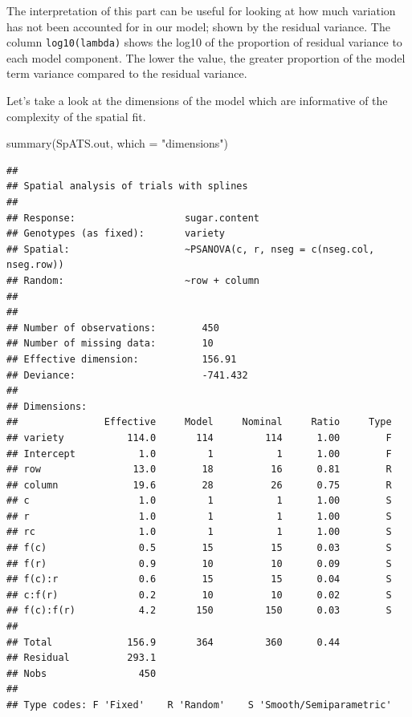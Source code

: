 \documentclass[
]{book}
\newenvironment{Shaded}{\begin{snugshade}}{\end{snugshade}}
\newcommand{\AttributeTok}[1]{\textcolor[rgb]{0.77,0.63,0.00}{#1}}
\newcommand{\FunctionTok}[1]{\textcolor[rgb]{0.00,0.00,0.00}{#1}}
\newcommand{\NormalTok}[1]{#1}
\newcommand{\StringTok}[1]{\textcolor[rgb]{0.31,0.60,0.02}{#1}}
\begin{document}
The interpretation of this part can be useful for looking at how much variation has not been accounted for in our model; shown by the residual variance. The column \texttt{log10(lambda)} shows the log10 of the proportion of residual variance to each model component. The lower the value, the greater proportion of the model term variance compared to the residual variance.

Let's take a look at the dimensions of the model which are informative of the complexity of the spatial fit.

\begin{Shaded}
\begin{Highlighting}[]
\FunctionTok{summary}\NormalTok{(SpATS.out, }\AttributeTok{which =} \StringTok{"dimensions"}\NormalTok{)}
\end{Highlighting}
\end{Shaded}

\begin{verbatim}
## 
## Spatial analysis of trials with splines 
## 
## Response:                   sugar.content
## Genotypes (as fixed):       variety   
## Spatial:                    ~PSANOVA(c, r, nseg = c(nseg.col, nseg.row))
## Random:                     ~row + column
## 
## 
## Number of observations:        450
## Number of missing data:        10
## Effective dimension:           156.91
## Deviance:                      -741.432
## 
## Dimensions:
##               Effective     Model     Nominal     Ratio     Type
## variety           114.0       114         114      1.00        F
## Intercept           1.0         1           1      1.00        F
## row                13.0        18          16      0.81        R
## column             19.6        28          26      0.75        R
## c                   1.0         1           1      1.00        S
## r                   1.0         1           1      1.00        S
## rc                  1.0         1           1      1.00        S
## f(c)                0.5        15          15      0.03        S
## f(r)                0.9        10          10      0.09        S
## f(c):r              0.6        15          15      0.04        S
## c:f(r)              0.2        10          10      0.02        S
## f(c):f(r)           4.2       150         150      0.03        S
##                                                                 
## Total             156.9       364         360      0.44         
## Residual          293.1                                         
## Nobs                450                                         
## 
## Type codes: F 'Fixed'    R 'Random'    S 'Smooth/Semiparametric'
\end{verbatim}
\end{document}
